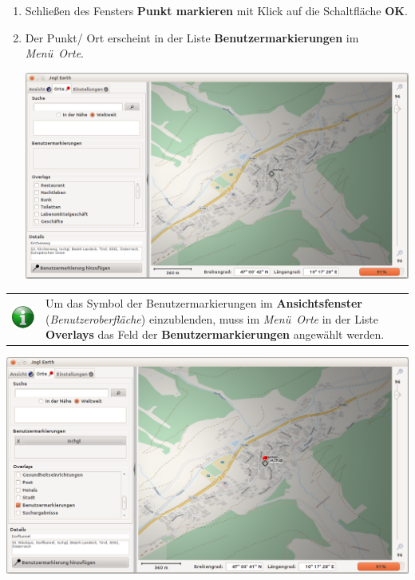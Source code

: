 \documentclass[10pt]{scrreprt}
\newcommand{\textref}[1]{\mbox{\raisebox{0.1ex}{\small$\rightarrow$ }\textit{#1}}}
\begin{document}
\begin{enumerate}
\begin{center}
	\end{center}
\item Schließen des Fensters \textbf{Punkt markieren} mit Klick auf die Schaltfläche \textbf{OK}.
\item Der Punkt/ Ort erscheint in der Liste \textbf{Benutzermarkierungen} im \textref{Menü Orte}.
	\vspace{2mm}
	\begin{center}
	\includegraphics[scale=0.25]{images/Benutzermarkierungs_Dialog3.png}
	\end{center}
\end{enumerate}


\newpage
\begin{tabular}{>{\centering \arraybackslash}m{1cm} m{14cm}} \index{Overlays}
\includegraphics[scale=0.5]{images/info.eps} & Um das Symbol der Benutzermarkierungen im \textbf{Ansichtsfenster} (\textref{Benutzeroberfläche}) einzublenden, muss im \textref{Menü Orte} in der Liste \textbf{Overlays} das Feld der \textbf{Benutzermarkierungen} angewählt werden.
\end{tabular}


\vspace{3mm}
\begin{center}
\includegraphics[scale=0.25]{images/Benutzermarkierungs_Dialog4.png}
\end{center}
\end{document}
